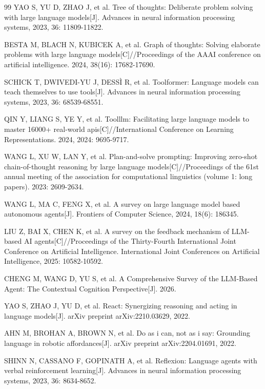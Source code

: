 \begin{thebibliography}{99}
YAO S, YU D, ZHAO J, et al. Tree of thoughts: Deliberate problem solving with large language models[J]. Advances in neural information processing systems, 2023, 36: 11809-11822.

BESTA M, BLACH N, KUBICEK A, et al. Graph of thoughts: Solving elaborate problems with large language models[C]//Proceedings of the AAAI conference on artificial intelligence. 2024, 38(16): 17682-17690.

SCHICK T, DWIVEDI-YU J, DESSÌ R, et al. Toolformer: Language models can teach themselves to use tools[J]. Advances in neural information processing systems, 2023, 36: 68539-68551.

QIN Y, LIANG S, YE Y, et al. Toolllm: Facilitating large language models to master 16000+ real-world apis[C]//International Conference on Learning Representations. 2024, 2024: 9695-9717.

WANG L, XU W, LAN Y, et al. Plan-and-solve prompting: Improving zero-shot chain-of-thought reasoning by large language models[C]//Proceedings of the 61st annual meeting of the association for computational linguistics (volume 1: long papers). 2023: 2609-2634.

WANG L, MA C, FENG X, et al. A survey on large language model based autonomous agents[J]. Frontiers of Computer Science, 2024, 18(6): 186345.

LIU Z, BAI X, CHEN K, et al. A survey on the feedback mechanism of LLM-based AI agents[C]//Proceedings of the Thirty-Fourth International Joint Conference on Artificial Intelligence. International Joint Conferences on Artificial Intelligence, 2025: 10582-10592.

CHENG M, WANG D, YU S, et al. A Comprehensive Survey of the LLM-Based Agent: The Contextual Cognition Perspective[J]. 2026.

YAO S, ZHAO J, YU D, et al. React: Synergizing reasoning and acting in language models[J]. arXiv preprint arXiv:2210.03629, 2022.

AHN M, BROHAN A, BROWN N, et al. Do as i can, not as i say: Grounding language in robotic affordances[J]. arXiv preprint arXiv:2204.01691, 2022.

SHINN N, CASSANO F, GOPINATH A, et al. Reflexion: Language agents with verbal reinforcement learning[J]. Advances in neural information processing systems, 2023, 36: 8634-8652.


\end{thebibliography}
